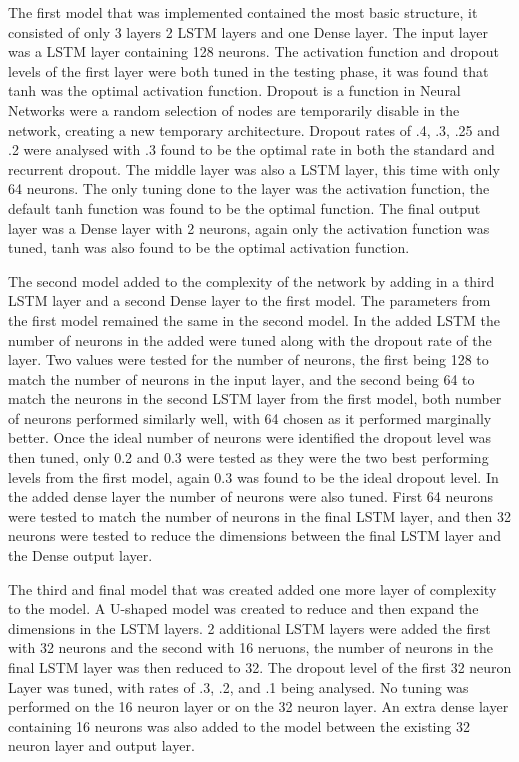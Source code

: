 \documentclass{imc-inf}
\begin{document}
	The first model that was implemented contained the most basic structure, it consisted of only 3 layers 2 LSTM layers and one Dense layer. The input layer was a LSTM layer containing 128 neurons. The activation function and dropout levels of the first layer were both tuned in the testing phase, it was found that tanh was the optimal activation function. Dropout is a function in Neural Networks were a random selection of nodes are temporarily disable in the network, creating a new temporary architecture. Dropout rates of .4, .3, .25 and .2  were analysed with .3 found to be the optimal rate in both the standard and recurrent dropout. The middle layer was also a LSTM layer, this time with only 64 neurons. The only tuning done to the layer was the activation function, the default tanh function was found to be the optimal function. The final output layer was a Dense layer with 2 neurons, again only the activation function was tuned, tanh was also found to be the optimal activation function.
	\newline
	
	The second model added to the complexity of the network by adding in a third LSTM layer and a second Dense layer to the first model. The parameters from the first model remained the same in the second model. In the added LSTM the number of neurons in the added were tuned along with the dropout rate of the layer. Two values were tested for the number of neurons, the first being 128 to match the number of neurons in the input layer, and the second being 64 to match the neurons in the second LSTM layer from the first model, both number of neurons performed similarly well, with 64 chosen as it performed marginally better. Once the ideal number of neurons were identified the dropout level was then tuned, only 0.2 and 0.3 were tested as they were the two best performing levels from the first model, again 0.3 was found to be the ideal dropout level. In the added dense layer the number of neurons were also tuned. First 64 neurons were tested to match the number of neurons in the final LSTM layer, and then 32 neurons were tested to reduce the dimensions between the final LSTM layer and the Dense output layer. 
	\newline
	
	The third and final model that was created added one more layer of complexity to the model. A U-shaped model was created to reduce and then expand the dimensions in the LSTM layers. 2 additional LSTM layers were added the first with 32 neurons and the second with 16 neruons, the number of neurons in the final LSTM layer was then reduced to 32. The dropout level of the first 32 neuron Layer was tuned, with rates of .3, .2, and .1 being analysed. No tuning was performed on the 16 neuron layer or on the 32 neuron layer. An extra dense layer containing 16 neurons was also added to the model between the existing 32 neuron layer and output layer. 
	
\end{document}
